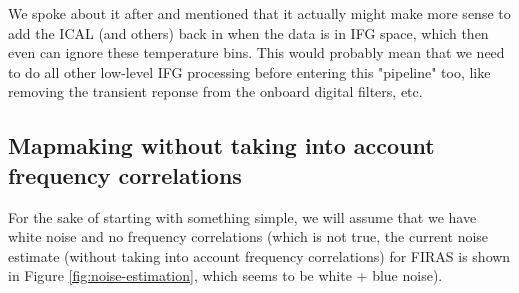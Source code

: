 \documentclass{article}
\begin{document}
We spoke about it after and mentioned that it actually might make more sense to add the ICAL (and others) back in when the data is in IFG space, which then even can ignore these temperature bins.
This would probably mean that we need to do all other low-level IFG processing before entering this "pipeline" too, like removing the transient reponse from the  onboard digital filters, etc.

\subsection{Mapmaking without taking into account frequency correlations}

For the sake of starting with something simple, we will assume that we have white noise and no frequency correlations (which is not true, the current noise estimate (without taking into account frequency correlations) for FIRAS is shown in Figure \ref{fig:noise-estimation}, which seems to be white + blue noise).
\end{document}
